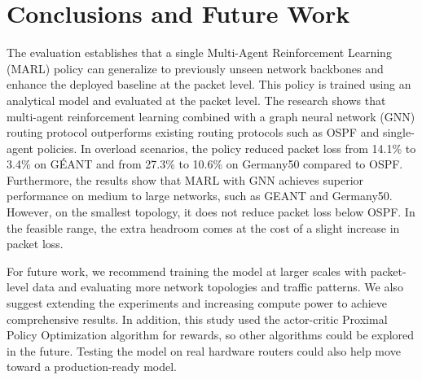 \section{Conclusions and Future Work}
The evaluation establishes that a single Multi-Agent Reinforcement Learning (MARL) policy can generalize to previously unseen network backbones and enhance the deployed baseline at the packet level. This policy is trained using an analytical model and evaluated at the packet level. The research shows that multi-agent reinforcement learning combined with a graph neural network (GNN) routing protocol outperforms existing routing protocols such as OSPF and single-agent policies. In overload scenarios, the policy reduced packet loss from 14.1\% to 3.4\% on GÉANT and from 27.3\% to 10.6\% on Germany50 compared to OSPF. Furthermore, the results show that MARL with GNN achieves superior performance on medium to large networks, such as GEANT and Germany50. However, on the smallest topology, it does not reduce packet loss below OSPF. In the feasible range, the extra headroom comes at the cost of a slight increase in packet loss.

For future work, we recommend training the model at larger scales with packet-level data and evaluating more network topologies and traffic patterns. We also suggest extending the experiments and increasing compute power to achieve comprehensive results. In addition, this study used the actor-critic Proximal Policy Optimization algorithm for rewards, so other algorithms could be explored in the future. Testing the model on real hardware routers could also help move toward a production-ready model.
